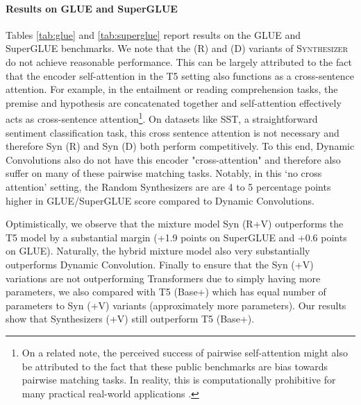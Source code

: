 \documentclass{article}
\begin{document}
\paragraph{Results on GLUE and SuperGLUE}
Tables \ref{tab:glue} and \ref{tab:superglue} report results on the GLUE and SuperGLUE benchmarks. We note that the (R) and (D) variants of \textsc{Synthesizer} do not achieve reasonable performance. This can be largely attributed to the fact that the encoder self-attention in the T5 setting also functions as a cross-sentence attention. For example, in the entailment or reading comprehension tasks, the premise and hypothesis are concatenated together and self-attention effectively acts as cross-sentence attention\footnote{On a related note, the perceived success of pairwise self-attention might also be attributed to the fact that these public benchmarks are bias towards pairwise matching tasks. In reality, this is computationally prohibitive for many practical real-world applications \citep{seo2018phrase}. }. On datasets like SST, a straightforward sentiment classification task, this cross sentence attention is not necessary and therefore Syn (R) and Syn (D) both perform competitively. To this end, Dynamic Convolutions \citep{wu2019pay} also do not have this encoder "cross-attention" and therefore also suffer on many of these pairwise matching tasks. Notably, in this `no cross attention' setting, the Random Synthesizers are are 4 to 5 percentage points higher in GLUE/SuperGLUE score compared to Dynamic Convolutions.

Optimistically, we observe that the mixture model Syn (R+V) outperforms the T5 model by a substantial margin (+1.9 points on SuperGLUE and +0.6 points on GLUE). Naturally, the hybrid mixture model also very substantially outperforms Dynamic Convolution. Finally to ensure that the Syn (+V) variations are not outperforming Transformers due to simply having more parameters, we also compared with T5 (Base+) which has equal number of parameters to Syn (+V) variants (approximately  more parameters). Our results show that Synthesizers (+V) still outperform T5 (Base+).
\end{document}
